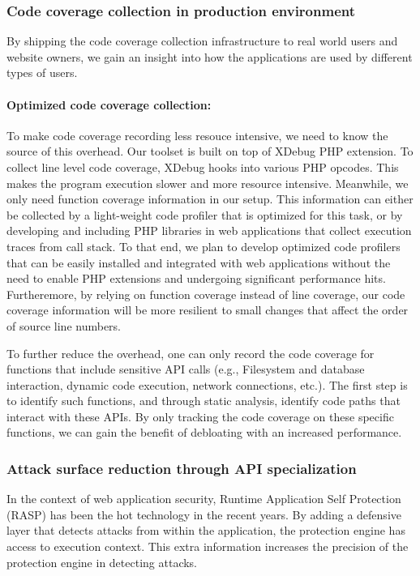 \subsubsection{Code coverage collection in production environment}
By shipping the code coverage collection infrastructure to real world users and website owners, we gain an insight into how the applications are used by different types of users.

\paragraph{Optimized code coverage collection:} To make code coverage recording less resouce intensive, we need to know the source of this overhead.
Our toolset is built on top of XDebug PHP extension. To collect line level code coverage, XDebug hooks into various PHP opcodes. This makes the program execution slower and more resource intensive. Meanwhile, we only need function coverage information in our setup. This information can either be collected by a light-weight code profiler that is optimized for this task, or by developing and including PHP libraries in web applications that collect execution traces from call stack. To that end, we plan to develop optimized code profilers that can be easily installed and integrated with web applications without the need to enable PHP extensions and undergoing significant performance hits. Furtheremore, by relying on function coverage instead of line coverage, our code coverage information will be more resilient to small changes that affect the order of source line numbers.

To further reduce the overhead, one can only record the code coverage for functions that include sensitive API calls (e.g., Filesystem and database interaction, dynamic code execution, network connections, etc.). The first step is to identify such functions, and through static analysis, identify code paths that interact with these APIs. By only tracking the code coverage on these specific functions, we can gain the benefit of debloating with an increased performance.

\subsubsection{Attack surface reduction through API specialization}
In the context of web application security, Runtime Application Self Protection (RASP) has been the hot technology in the recent years. By adding a defensive layer that detects attacks from within the application, the protection engine has access to execution context. This extra information increases the precision of the protection engine in detecting attacks.

